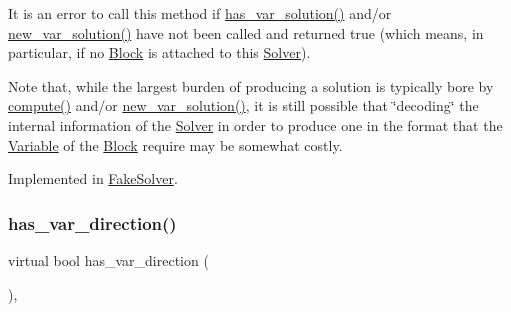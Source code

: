 It is an error to call this method if \mbox{\hyperlink{class_s_m_spp__di__unipi__it_1_1_solver_aa96263f4e0c59225f3f5d54f03fe31ee}{has\+\_\+var\+\_\+solution()}} and/or \mbox{\hyperlink{class_s_m_spp__di__unipi__it_1_1_solver_af109b504a566c90a4ea45c1574c128fe}{new\+\_\+var\+\_\+solution()}} have not been called and returned true (which means, in particular, if no \mbox{\hyperlink{class_s_m_spp__di__unipi__it_1_1_block}{Block}} is attached to this \mbox{\hyperlink{class_s_m_spp__di__unipi__it_1_1_solver}{Solver}}).

Note that, while the largest burden of producing a solution is typically bore by \mbox{\hyperlink{class_s_m_spp__di__unipi__it_1_1_solver_a504d4e3e174c7a518cc66156a8a45ce5}{compute()}} and/or \mbox{\hyperlink{class_s_m_spp__di__unipi__it_1_1_solver_af109b504a566c90a4ea45c1574c128fe}{new\+\_\+var\+\_\+solution()}}, it is still possible that \char`\"{}decoding\char`\"{} the internal information of the \mbox{\hyperlink{class_s_m_spp__di__unipi__it_1_1_solver}{Solver}} in order to produce one in the format that the \mbox{\hyperlink{class_s_m_spp__di__unipi__it_1_1_variable}{Variable}} of the \mbox{\hyperlink{class_s_m_spp__di__unipi__it_1_1_block}{Block}} require may be somewhat costly. 

Implemented in \mbox{\hyperlink{class_s_m_spp__di__unipi__it_1_1_fake_solver_ac83fa9679882440d13fb5940494699c5}{Fake\+Solver}}.

\mbox{\label{class_s_m_spp__di__unipi__it_1_1_solver_a27e8c876f577289e523ebf26aeeb977a}} 
\subsubsection{\texorpdfstring{has\+\_\+var\+\_\+direction()}{has\_var\_direction()}}
{\footnotesize\ttfamily virtual bool has\+\_\+var\+\_\+direction (\begin{DoxyParamCaption}\item[{void}]{ }\end{DoxyParamCaption})\hspace{0.3cm}{\ttfamily [inline]}, {\ttfamily [virtual]}}




